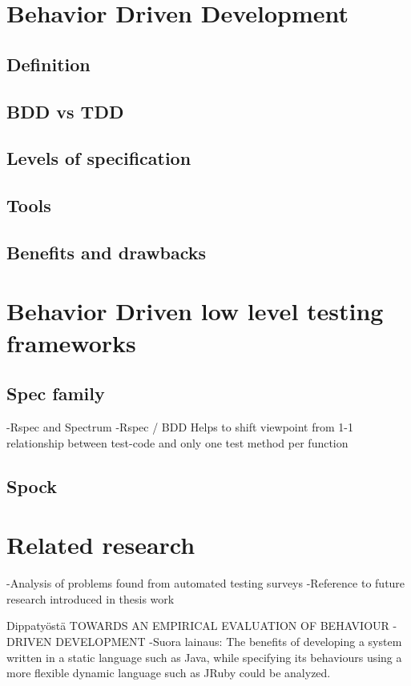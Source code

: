 \section{Behavior Driven Development} %
    \subsection{Definition}
    \subsection{BDD vs TDD}
    \subsection{Levels of specification}
    \subsection{Tools}
    \subsection{Benefits and drawbacks}
\section{Behavior Driven low level testing frameworks} %
    \subsection{Spec family}
            -Rspec and Spectrum\newline
            -Rspec / BDD Helps to shift viewpoint from 1-1 relationship between test-code and only one test method per function
    \subsection{Spock}
\section{Related research} %
    -Analysis of problems found from automated testing surveys\newline
    -Reference to future research introduced in thesis work\newline

    Dippatyöstä TOWARDS AN EMPIRICAL EVALUATION
                OF BEHAVIOUR - DRIVEN DEVELOPMENT\newline
    -Suora lainaus: The benefits of developing a system written in a static language such as Java, while specifying its
     behaviours using a more flexible dynamic language such as JRuby could be analyzed.\newline\newline

